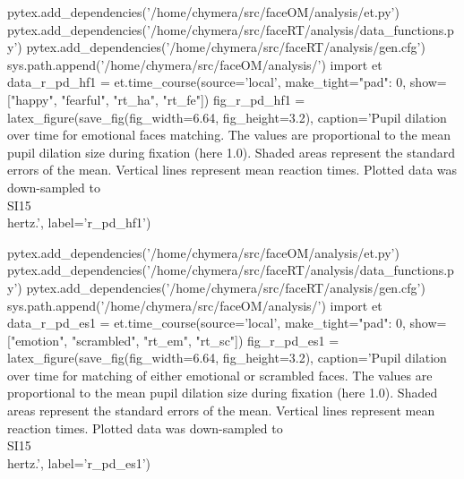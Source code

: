 \begin{pycode}[r_pd_hf1]
pytex.add_dependencies('/home/chymera/src/faceOM/analysis/et.py')
pytex.add_dependencies('/home/chymera/src/faceRT/analysis/data_functions.py')
pytex.add_dependencies('/home/chymera/src/faceRT/analysis/gen.cfg')
sys.path.append('/home/chymera/src/faceOM/analysis/')
import et
data_r_pd_hf1 = et.time_course(source='local', make_tight={"pad": 0}, show=["happy", "fearful", "rt_ha", "rt_fe"])
fig_r_pd_hf1 = latex_figure(save_fig(fig_width=6.64, fig_height=3.2), caption='Pupil dilation over time for emotional faces matching. The values are proportional to the mean pupil dilation size during fixation (here 1.0). Shaded areas represent the standard errors of the mean. Vertical lines represent mean reaction times. Plotted data was down-sampled to \\SI{15}{\\hertz}.', label='r_pd_hf1')
\end{pycode}
\begin{pycode}[r_pd_es1]
pytex.add_dependencies('/home/chymera/src/faceOM/analysis/et.py')
pytex.add_dependencies('/home/chymera/src/faceRT/analysis/data_functions.py')
pytex.add_dependencies('/home/chymera/src/faceRT/analysis/gen.cfg')
sys.path.append('/home/chymera/src/faceOM/analysis/')
import et
data_r_pd_es1 = et.time_course(source='local', make_tight={"pad": 0}, show=["emotion", "scrambled", "rt_em", "rt_sc"])
fig_r_pd_es1 = latex_figure(save_fig(fig_width=6.64, fig_height=3.2), caption='Pupil dilation over time for matching of either emotional or scrambled faces. The values are proportional to the mean pupil dilation size during fixation (here 1.0). Shaded areas represent the standard errors of the mean. Vertical lines represent mean reaction times. Plotted data was down-sampled to \\SI{15}{\\hertz}.', label='r_pd_es1')
\end{pycode}
